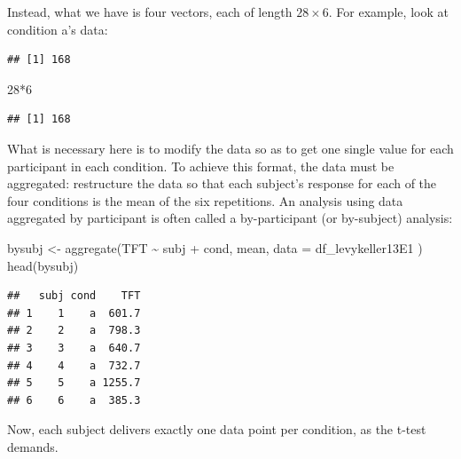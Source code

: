 \documentclass[
  12pt,
]{krantz}
\newenvironment{Shaded}{\begin{snugshade}}{\end{snugshade}}
\newcommand{\AttributeTok}[1]{\textcolor[rgb]{0.77,0.63,0.00}{#1}}
\newcommand{\DecValTok}[1]{\textcolor[rgb]{0.00,0.00,0.81}{#1}}
\newcommand{\FunctionTok}[1]{\textcolor[rgb]{0.00,0.00,0.00}{#1}}
\newcommand{\NormalTok}[1]{#1}
\newcommand{\OtherTok}[1]{\textcolor[rgb]{0.56,0.35,0.01}{#1}}
\newcommand{\SpecialCharTok}[1]{\textcolor[rgb]{0.00,0.00,0.00}{#1}}
\newcommand{\StringTok}[1]{\textcolor[rgb]{0.31,0.60,0.02}{#1}}
\theoremstyle{definition}
\theoremstyle{definition}
\theoremstyle{definition}
\theoremstyle{definition}
\theoremstyle{remark}
\begin{document}
Instead, what we have is four vectors, each of length \(28\times 6\). For example, look at condition a's data:

\begin{Shaded}
\end{Shaded}

\begin{verbatim}
## [1] 168
\end{verbatim}

\begin{Shaded}
\begin{Highlighting}[]
\DecValTok{28}\SpecialCharTok{*}\DecValTok{6}
\end{Highlighting}
\end{Shaded}

\begin{verbatim}
## [1] 168
\end{verbatim}

What is necessary here is to modify the data so as to get one single value for each participant in each condition. To achieve this format, the data must be aggregated: restructure the data so that each subject's response for each of the four conditions is the mean of the six repetitions. An analysis using data aggregated by participant is often called a by-participant (or by-subject) analysis:

\begin{Shaded}
\begin{Highlighting}[]
\NormalTok{bysubj }\OtherTok{\textless{}{-}} \FunctionTok{aggregate}\NormalTok{(TFT }\SpecialCharTok{\textasciitilde{}}\NormalTok{ subj }\SpecialCharTok{+}\NormalTok{ cond,}
\NormalTok{  mean,}
  \AttributeTok{data =}\NormalTok{ df\_levykeller13E1}
\NormalTok{)}
\FunctionTok{head}\NormalTok{(bysubj)}
\end{Highlighting}
\end{Shaded}

\begin{verbatim}
##   subj cond    TFT
## 1    1    a  601.7
## 2    2    a  798.3
## 3    3    a  640.7
## 4    4    a  732.7
## 5    5    a 1255.7
## 6    6    a  385.3
\end{verbatim}

Now, each subject delivers exactly one data point per condition, as the t-test demands.
\end{document}
